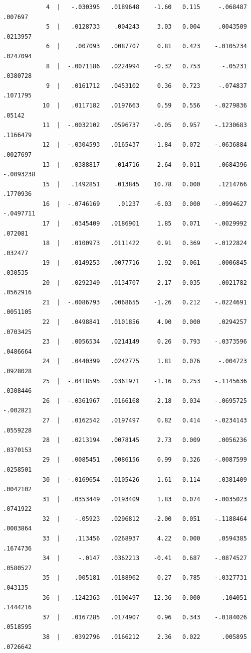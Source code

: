 \documentclass[
]{book}
\begin{document}
\begin{verbatim}
            4  |   -.030395   .0189648    -1.60   0.115     -.068487     .007697
            5  |   .0128733    .004243     3.03   0.004     .0043509    .0213957
            6  |    .007093   .0087707     0.81   0.423    -.0105234    .0247094
            8  |  -.0071186   .0224994    -0.32   0.753      -.05231    .0380728
            9  |   .0161712   .0453102     0.36   0.723     -.074837    .1071795
           10  |   .0117182   .0197663     0.59   0.556    -.0279836      .05142
           11  |  -.0032102   .0596737    -0.05   0.957    -.1230683    .1166479
           12  |  -.0304593   .0165437    -1.84   0.072    -.0636884    .0027697
           13  |  -.0388817    .014716    -2.64   0.011    -.0684396   -.0093238
           15  |   .1492851    .013845    10.78   0.000     .1214766    .1770936
           16  |  -.0746169     .01237    -6.03   0.000    -.0994627   -.0497711
           17  |   .0345409   .0186901     1.85   0.071    -.0029992     .072081
           18  |   .0100973   .0111422     0.91   0.369    -.0122824     .032477
           19  |   .0149253   .0077716     1.92   0.061    -.0006845     .030535
           20  |   .0292349   .0134707     2.17   0.035     .0021782    .0562916
           21  |  -.0086793   .0068655    -1.26   0.212    -.0224691    .0051105
           22  |   .0498841   .0101856     4.90   0.000     .0294257    .0703425
           23  |   .0056534   .0214149     0.26   0.793    -.0373596    .0486664
           24  |   .0440399   .0242775     1.81   0.076     -.004723    .0928028
           25  |  -.0418595   .0361971    -1.16   0.253    -.1145636    .0308446
           26  |  -.0361967   .0166168    -2.18   0.034    -.0695725    -.002821
           27  |   .0162542   .0197497     0.82   0.414    -.0234143    .0559228
           28  |   .0213194   .0078145     2.73   0.009     .0056236    .0370153
           29  |   .0085451   .0086156     0.99   0.326    -.0087599    .0258501
           30  |  -.0169654   .0105426    -1.61   0.114    -.0381409    .0042102
           31  |   .0353449   .0193409     1.83   0.074    -.0035023    .0741922
           32  |    -.05923   .0296812    -2.00   0.051    -.1188464    .0003864
           33  |    .113456   .0268937     4.22   0.000     .0594385    .1674736
           34  |     -.0147   .0362213    -0.41   0.687    -.0874527    .0580527
           35  |    .005181   .0188962     0.27   0.785    -.0327731     .043135
           36  |   .1242363   .0100497    12.36   0.000      .104051    .1444216
           37  |   .0167285   .0174907     0.96   0.343    -.0184026    .0518595
           38  |   .0392796   .0166212     2.36   0.022      .005895    .0726642

\end{verbatim}
\end{document}
